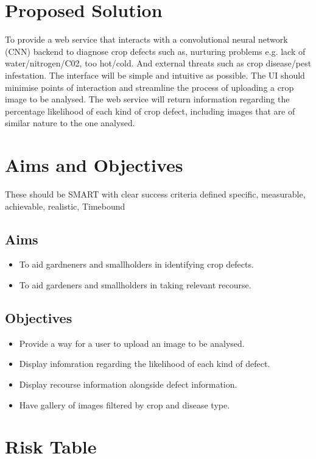 \section{Proposed Solution}
  To provide a web service that interacts with a convolutional neural network (CNN) backend to diagnose crop defects such as, nurturing problems e.g. lack of water/nitrogen/C02, too hot/cold. And external threats such as crop disease/pest infestation. The interface will be simple and intuitive as possible. The UI should minimise points of interaction and streamline the process of uploading a crop image to be analysed.
	The web service will return information regarding the percentage likelihood of each kind of crop defect, including images that are of similar nature to the one analysed.

\section{Aims and Objectives}
  These should be SMART with clear success criteria defined
  specific, measurable, achievable, realistic, Timebound
  \subsection{Aims}
    \begin{itemize}
      \item To aid gardneners and smallholders in identifying crop defects.
      \item To aid gardeners and smallholders in taking relevant recourse.
    \end{itemize}
  \subsection{Objectives}
    \begin{itemize}
      \item Provide a way for a user to upload an image to be analysed.
      \item Display infomration regarding the likelihood of each kind of defect.
      \item Display recourse information alongside defect information.
      \item Have gallery of images filtered by crop and disease type.
    \end{itemize}

\section{Risk Table}


